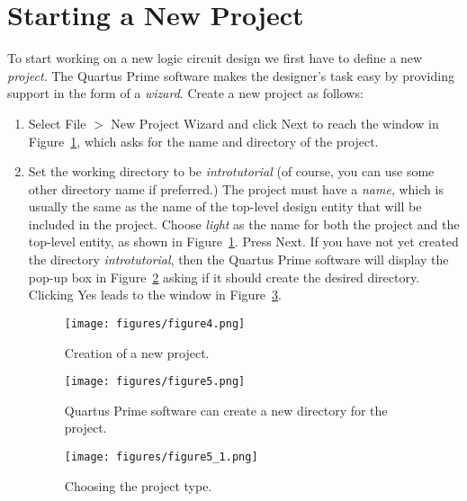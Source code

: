\section{Starting a New Project}


To start working on a new logic circuit design we first have to define a new {\it project}.
The Quartus Prime software makes the designer's task easy by providing support in the form
of a {\it wizard}.  Create a new project as follows:
\begin{enumerate}
\item Select {\sf File $>$ New Project Wizard} and click {\sf Next} to 
reach the window in Figure~\ref{fig:4},
which asks for the name and directory of the project.

\item Set the working directory to be {\it introtutorial}
(of course, you can use some other directory name if preferred.)
The project must have a {\it name}, which is usually the same as the 
name of the top-level design entity that will be included in the project.
Choose {\it light} as the name for both the project
and the top-level entity, as shown in Figure~\ref{fig:4}.  Press {\sf Next}. 
If you have not yet created the directory {\it introtutorial},
then the Quartus Prime software will display the pop-up box in Figure~\ref{fig:5} asking 
if it should create the desired directory. Clicking {\sf Yes} leads to
the window in Figure~\ref{fig:5_1}.

\begin{figure}[H]
   \begin{center}
      \texttt{[image: figures/figure4.png]}
   \caption{Creation of a new project.}
	 \label{fig:4}
	 \end{center}
\end{figure}

\begin{figure}[H]
   \begin{center}
      \texttt{[image: figures/figure5.png]}
   \caption{Quartus Prime software can create a new directory for the project.} 
	 \label{fig:5}
	 \end{center}
\end{figure}

\begin{figure}[H]
   \begin{center}
      \texttt{[image: figures/figure5\_1.png]}
   \caption{Choosing the project type.} 
	 \label{fig:5_1}
	 \end{center}
\end{figure}


\end{enumerate}
